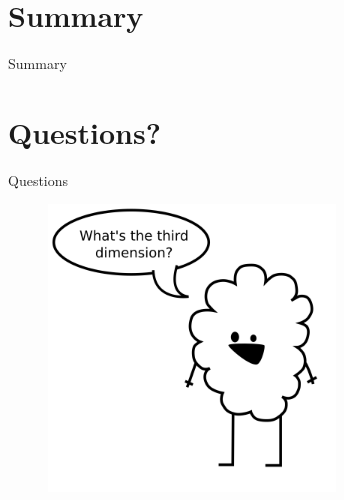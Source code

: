 \documentclass[style=smrt,mode=present,paper=screen]{powerdot}
\begin{document}

\section[slide=false]{Summary}
\begin{slide}[toc=,bm=]{Summary}
\tableofcontents[content=sections,type=1]
\end{slide}

\section[slide=false]{Questions?}
\begin{slide}[toc=,bm=]{Questions}
\begin{figure}[htb]
	\includegraphics[width=3in]{../lib/figures/fishstick}
\end{figure}
\end{slide}
\end{document}
